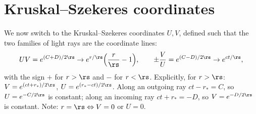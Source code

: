 \section{Kruskal--Szekeres coordinates}

We now switch to the Kruskal--Szekeres coordinates $U,V$, defined such that the two families of light rays are the coordinate lines:
\begin{equation}
  UV=e^{(C+D)/2\rs}\to e^{r/\rs}\Big(\frac r\rs-1\Big),\qquad
  \pm\frac VU=e^{(C-D)/2\rs}\to e^{ct/\rs},
  \label{eq:kruskal}
\end{equation}
with the sign $+$ for $r>\rs$ and $-$ for $r<\rs$. Explicitly, for $r>\rs$: $V=e^{(ct+r_*)/2\rs}$, $U=e^{(r_*-ct)/2\rs}$. Along an outgoing ray $ct-r_*=C$, so $U=e^{-C/2\rs}$ is constant; along an incoming ray $ct+r_*=-D$, so $V=e^{-D/2\rs}$ is constant. Note: $r=\rs\Leftrightarrow V=0$ or $U=0$.

